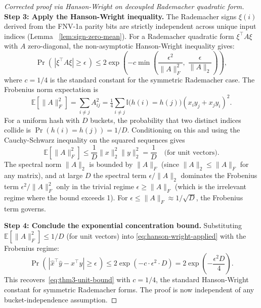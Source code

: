 \documentclass[10pt,twocolumn]{article}
\theoremstyle{definition}
\theoremstyle{remark}
\begin{document}
\begin{proof}[Corrected proof via Hanson-Wright on decoupled Rademacher
quadratic form]
\textbf{Step 3: Apply the Hanson-Wright inequality.} The Rademacher
signs $\xi(i)$ derived from the FNV-1a parity bits are strictly
independent across unique input indices (Lemma~
\ref{lem:sign-zero-mean}). For a Rademacher quadratic form
$\xi^\top A \xi$ with $A$ zero-diagonal, the non-asymptotic
Hanson-Wright inequality \citep{hansonwright1971} gives:
\begin{equation}
\Pr\!\left(\,|\xi^\top A \xi| \ge \epsilon\,\right) \le 2 \exp\!\left(
   -c \min\!\left(\frac{\epsilon^2}{\|A\|_F^2},\;
                   \frac{\epsilon}{\|A\|_2}\right)\right),
\label{eq:hanson-wright-applied}
\end{equation}
where $c = 1/4$ is the standard constant for the symmetric
Rademacher case. The Frobenius norm expectation is
\begin{equation}
\mathbb{E}[\|A\|_F^2]
   = \sum_{i \neq j} A_{ij}^2
   = \tfrac{1}{4} \sum_{i \neq j} \mathbb{I}\bigl(h(i) = h(j)\bigr)
                       (x_i y_j + x_j y_i)^2.
\end{equation}
For a uniform hash with $D$ buckets, the probability that two
distinct indices collide is $\Pr(h(i) = h(j)) = 1/D$. Conditioning
on this and using the Cauchy-Schwarz inequality on the squared
sequences gives
\begin{equation}
\mathbb{E}[\|A\|_F^2] \le \frac{1}{D} \|x\|_2^2 \|y\|_2^2
   = \frac{1}{D} \quad \text{(for unit vectors).}
\end{equation}
The spectral norm $\|A\|_2$ is bounded by $\|A\|_F$ (since $\|A\|_2
\le \|A\|_F$ for any matrix), and at large $D$ the spectral term
$\epsilon / \|A\|_2$ dominates the Frobenius term $\epsilon^2 /
\|A\|_F^2$ only in the trivial regime $\epsilon \ge \|A\|_F$ (which
is the irrelevant regime where the bound exceeds 1). For
$\epsilon \le \|A\|_F \approx 1/\sqrt{D}$, the Frobenius term
governs.

\textbf{Step 4: Conclude the exponential concentration bound.}
Substituting $\mathbb{E}[\|A\|_F^2] \le 1/D$ (for unit vectors) into
\eqref{eq:hanson-wright-applied} with the Frobenius regime:
\begin{equation}
\Pr\!\left(\,|\hat{x}^\top \hat{y} - x^\top y| \ge \epsilon\,\right)
   \le 2 \exp\!\left(
       -c \cdot \epsilon^2 \cdot D\right)
   = 2 \exp\!\left(-\frac{\epsilon^2 D}{4}\right).
\label{eq:hanson-wright-final}
\end{equation}
This recovers~\eqref{eq:thm3-unit-bound} with $c = 1/4$, the
standard Hanson-Wright constant for symmetric Rademacher forms. The
proof is now independent of any bucket-independence assumption. \qedhere
\end{proof}
\end{document}
